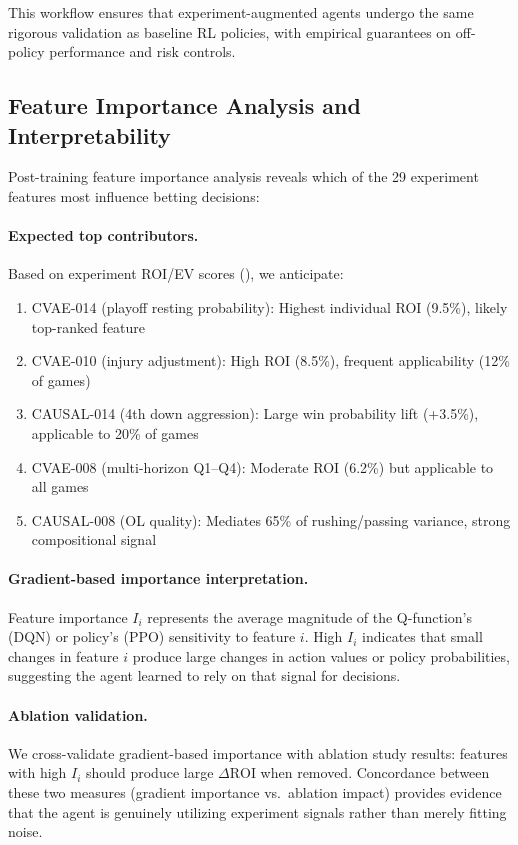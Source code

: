 This workflow ensures that experiment-augmented agents undergo the same rigorous validation as baseline RL policies, with empirical guarantees on off-policy performance and risk controls.

\subsection{Feature Importance Analysis and Interpretability}

Post-training feature importance analysis reveals which of the 29 experiment features most influence betting decisions:

\paragraph{Expected top contributors.}
Based on experiment ROI/EV scores (), we anticipate:
\begin{enumerate}
  \item CVAE-014 (playoff resting probability): Highest individual ROI (9.5\%), likely top-ranked feature
  \item CVAE-010 (injury adjustment): High ROI (8.5\%), frequent applicability (12\% of games)
  \item CAUSAL-014 (4th down aggression): Large win probability lift (+3.5\%), applicable to 20\% of games
  \item CVAE-008 (multi-horizon Q1--Q4): Moderate ROI (6.2\%) but applicable to all games
  \item CAUSAL-008 (OL quality): Mediates 65\% of rushing/passing variance, strong compositional signal
\end{enumerate}

\paragraph{Gradient-based importance interpretation.}
Feature importance $I_i$ represents the average magnitude of the Q-function's (DQN) or policy's (PPO) sensitivity to feature $i$. High $I_i$ indicates that small changes in feature $i$ produce large changes in action values or policy probabilities, suggesting the agent learned to rely on that signal for decisions.

\paragraph{Ablation validation.}
We cross-validate gradient-based importance with ablation study results: features with high $I_i$ should produce large $\Delta \text{ROI}$ when removed. Concordance between these two measures (gradient importance vs.\ ablation impact) provides evidence that the agent is genuinely utilizing experiment signals rather than merely fitting noise.

